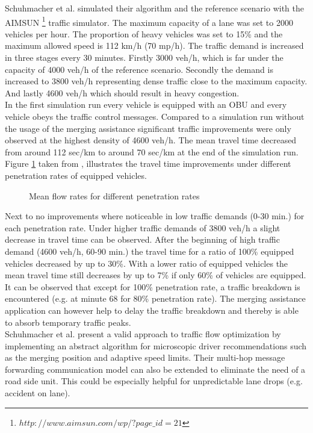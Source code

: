 \documentclass{sig-alternate}
\begin{document}
Schuhmacher et al. simulated their algorithm and the reference scenario with the AIMSUN \footnote{$http://www.aimsun.com/wp/?page\_id=21$} traffic simulator. 
The maximum capacity of a lane was set to 2000 vehicles per hour. The proportion of heavy vehicles was set to 15\% and the maximum allowed speed is 112 km/h (70 mp/h). The traffic demand is increased in three stages every 30 minutes. Firstly 3000 veh/h, which is far under the capacity of 4000 veh/h of the reference scenario. Secondly the demand is increased to 3800 veh/h representing dense traffic close to the maximum capacity. And lastly 4600 veh/h which should result in heavy congestion. \\
In the first simulation run every vehicle is equipped with an OBU and every vehicle obeys the traffic control messages. Compared to a simulation run without the usage of the merging assistance significant traffic improvements were only observed at the highest density of 4600 veh/h. The mean travel time decreased from around 112 sec/km to around 70 sec/km at the end of the simulation run. \\
Figure \ref{fig:schuhmacher2} taken from \cite{1614269.1614274}, illustrates the travel time improvements under different penetration rates of equipped vehicles. 
\begin{figure} [h]
\centering
{}
\caption{Mean flow rates for different penetration rates}
\label{fig:schuhmacher2}
\end{figure}
Next to no improvements where noticeable in low traffic demands (0-30 min.) for each penetration rate. Under higher traffic demands of 3800 veh/h a slight decrease in travel time can be observed. After the beginning of high traffic demand (4600 veh/h, 60-90 min.) the travel time for a ratio of 100\% equipped vehicles decreased by up to 30\%. With a lower ratio of equipped vehicles the mean travel time still decreases by up to 7\% if only 60\% of vehicles are equipped. It can be observed that except for 100\% penetration rate, a traffic breakdown is encountered (e.g. at minute 68 for 80\% penetration rate). The merging assistance application can however help to delay the traffic breakdown and thereby is able to absorb temporary traffic peaks. \\
Schuhmacher et al. present a valid approach to traffic flow optimization by implementing an abstract algorithm for microscopic driver recommendations such as the merging position and adaptive speed limits. Their multi-hop message forwarding communication model can also be extended to eliminate the need of a road side unit. This could be especially helpful for unpredictable lane drops (e.g. accident on lane).
\end{document}
